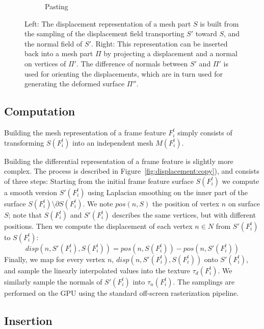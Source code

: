 \begin{figure}[t!]
\begin{subfigure}[b]{0.48\linewidth}
    \caption{\label{fig:displacement:insertion}Pasting}
    \end{subfigure}
    \caption[Fluid sculpting: Copy/Paste]{
    Left: The displacement representation of a mesh part $S$ is built from the sampling of the displacement field transporting $S'$ toward $S$, and the normal field of $S'$.
    Right: This representation can be inserted back into a mesh part $\Pi$ by projecting a displacement and a normal on vertices of $\Pi'$. 
    The difference of normals between $S'$ and $\Pi'$ is used for orienting the displacements, which are in turn used for generating the deformed surface $\Pi''$.
    }
    \label{fig:displacement}
\end{figure}

\subsection{Computation}
\label{sec:representation:computation}

Building the mesh representation of a frame feature $F^t_i$ simply consists of transforming $S(F^t_i)$ into an independent mesh $M(F^t_i)$.

Building the differential representation of a frame feature is slightly more complex.
The process is described in Figure~\ref{fig:displacement:copy}), and consists of three steps:
Starting from the initial frame feature surface $S(F^t_i)$ we compute a smooth version $S'(F^t_i)$ using Laplacian smoothing on the inner part of the surface $S(F^t_i) \setminus \partial S(F^t_i)$.
We note $pos(n, S)$ the position of vertex $n$ on surface $S$; note that $S(F^t_i)$ and $S'(F^t_i)$ describes the same vertices, but with different positions.
Then we compute the displacement of each vertex $n \in N$ from $S'(F^t_i)$ to $S(F^t_i)$:
\begin{equation}
    disp(n,S'(F^t_i), S(F^t_i) ) = pos(n, S(F^t_i)) - pos(n, S'(F^t_i))
\end{equation}
Finally, we map for every vertex $n$, $disp(n,S'(F^t_i), S(F^t_i))$ onto $S'(F^t_i)$, and sample the linearly interpolated values into the texture $\tau_d(F^t_i)$.
We similarly sample the normals of $S'(F^t_i)$ into $\tau_n(F^t_i)$.
The samplings are performed on the GPU using the standard off-screen rasterization pipeline.

\subsection{Insertion}
\label{sec:representation:insertion}

